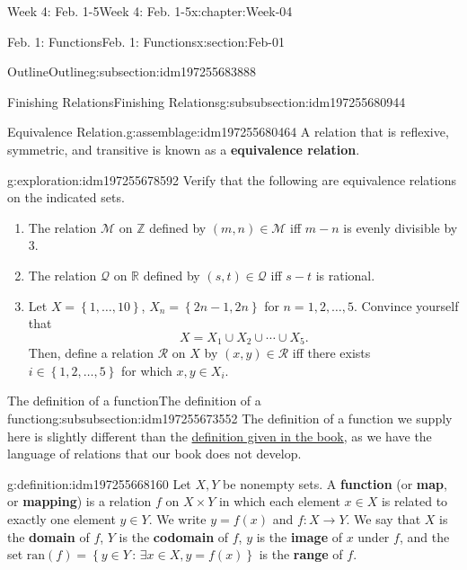 \documentclass[oneside,10pt,]{book}
\newcommand{\terminology}[1]{\textbf{#1}}
\numberwithin{equation}{section}
\def\ran{\text{ran}}
\newcommand{\set}[1]{\left\{ {#1} \right\}}
\newcommand{\setof}[2]{{\left\{#1\,\colon\,#2\right\}}}
\def\Z{{\mathbb Z}}
\def\R{{\mathbb R}}
\newcommand{\Z}{\mathbb Z}
\newcommand{\R}{\mathbb R}
\begin{document}
\begin{chapterptx}{Week 4: Feb. 1-5}{}{Week 4: Feb. 1-5}{}{}{x:chapter:Week-04}
\begin{sectionptx}{Feb. 1: Functions}{}{Feb. 1: Functions}{}{}{x:section:Feb-01}
\begin{subsectionptx}{Outline}{}{Outline}{}{}{g:subsection:idm197255683888}
\begin{subsubsectionptx}{Finishing Relations}{}{Finishing Relations}{}{}{g:subsubsection:idm197255680944}
\begin{assemblage}{Equivalence Relation.}{g:assemblage:idm197255680464}%
A relation that is reflexive, symmetric, and transitive is known as a \terminology{equivalence relation}.%
\end{assemblage}
\begin{exploration}{}{g:exploration:idm197255678592}%
Verify that the following are equivalence relations on the indicated sets.%
%
\begin{enumerate}
\item{}The relation \(\mathcal{M}\) on \(\Z\) defined by \((m,n)\in \mathcal{M}\) iff \(m-n\) is evenly divisible by 3.%
\item{}The relation \(\mathcal{Q}\) on \(\R\) defined by \((s,t)\in \mathcal{Q}\) iff \(s-t\) is rational.%
\item{}Let \(X = \set{1,\ldots, 10}\), \(X_n = \set{2n-1,2n}\) for \(n=1,2,\ldots, 5\). Convince yourself that%
\begin{equation*}
X = X_1 \cup X_2 \cup \cdots \cup X_5.
\end{equation*}
Then, define a relation \(\mathcal{R}\) on \(X\) by \((x,y)\in \mathcal{R}\) iff there exists \(i\in \set{1,2,\ldots,5}\) for which \(x,y\in X_i\).%
\end{enumerate}
\end{exploration}%
\end{subsubsectionptx}
%
%
\typeout{************************************************}
\typeout{************************************************}
%
\begin{subsubsectionptx}{The definition of a function}{}{The definition of a function}{}{}{g:subsubsection:idm197255673552}
The definition of a function we supply here is slightly different than the \href{http://discrete.openmathbooks.org/dmoi3/sec_intro-functions.html\#sKa}{definition given in the book}, as we have the language of relations that our book does not develop.%
\begin{definition}{}{g:definition:idm197255668160}%
Let \(X,Y\) be nonempty sets. A \terminology{function} (or \terminology{map}, or \terminology{mapping}) is a relation \(f\) on \(X\times Y\) in which each element \(x\in X\) is related to exactly one element \(y\in Y\). We write \(y = f(x)\) and \(f : X\to Y\). We say that \(X\) is the \terminology{domain} of \(f\), \(Y\) is the \terminology{codomain} of \(f\), \(y\) is the \terminology{image} of \(x\) under \(f\), and the set \(\ran(f) = \setof{y\in Y}{\exists x\in X, y=f(x)}\) is the \terminology{range} of \(f\).%

\end{definition}
\end{subsubsectionptx}
\end{subsectionptx}
\end{sectionptx}
\end{chapterptx}
\end{document}
